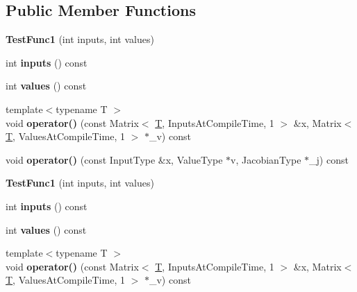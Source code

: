 \subsection*{Public Member Functions}
\begin{DoxyCompactItemize}
\item 
\mbox{\label{struct_test_func1_af2a06629de53467c0d5c594018ee80a9}} 
{\bfseries Test\+Func1} (int inputs, int values)
\item 
\mbox{\label{struct_test_func1_a08733a3cf64b83c0d214ade243279e69}} 
int {\bfseries inputs} () const
\item 
\mbox{\label{struct_test_func1_a881325f1562912d74dcf228d0449fe8d}} 
int {\bfseries values} () const
\item 
\mbox{\label{struct_test_func1_a6d188c9a6b072162ef0130c850fa4778}} 
{\footnotesize template$<$typename T $>$ }\\void {\bfseries operator()} (const Matrix$<$ \hyperlink{group___sparse_core___module}{T}, Inputs\+At\+Compile\+Time, 1 $>$ \&x, Matrix$<$ \hyperlink{group___sparse_core___module}{T}, Values\+At\+Compile\+Time, 1 $>$ $\ast$\+\_\+v) const
\item 
\mbox{\label{struct_test_func1_ae4af3d01d2e53bdeb6fb908b945157a4}} 
void {\bfseries operator()} (const Input\+Type \&x, Value\+Type $\ast$v, Jacobian\+Type $\ast$\+\_\+j) const
\item 
\mbox{\label{struct_test_func1_af2a06629de53467c0d5c594018ee80a9}} 
{\bfseries Test\+Func1} (int inputs, int values)
\item 
\mbox{\label{struct_test_func1_a08733a3cf64b83c0d214ade243279e69}} 
int {\bfseries inputs} () const
\item 
\mbox{\label{struct_test_func1_a881325f1562912d74dcf228d0449fe8d}} 
int {\bfseries values} () const
\item 
\mbox{\label{struct_test_func1_a6d188c9a6b072162ef0130c850fa4778}} 
{\footnotesize template$<$typename T $>$ }\\void {\bfseries operator()} (const Matrix$<$ \hyperlink{group___sparse_core___module}{T}, Inputs\+At\+Compile\+Time, 1 $>$ \&x, Matrix$<$ \hyperlink{group___sparse_core___module}{T}, Values\+At\+Compile\+Time, 1 $>$ $\ast$\+\_\+v) const

\end{DoxyCompactItemize}
